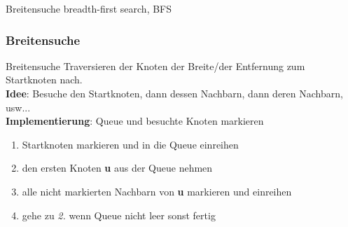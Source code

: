 \begin{frame}
    \Huge Breitensuche
    \Large breadth-first search, BFS
\end{frame}
\begin{frame}
    \frametitle{Breitensuche}
    \begin{KITinfoblock}{Breitensuche}
        Traversieren der Knoten der Breite/der Entfernung zum Startknoten nach.\\[0.7em]
        \textbf{Idee}: Besuche den Startknoten, dann dessen Nachbarn, dann deren Nachbarn, usw...\\[0.7em]
        \textbf{Implementierung}: Queue und besuchte Knoten markieren
        \begin{enumerate}
            \item Startknoten markieren und in die Queue einreihen
            \item den ersten Knoten \textbf{u} aus der Queue nehmen
            \item alle nicht markierten Nachbarn von \textbf{u} markieren und einreihen
            \item gehe zu \textit{2.} wenn Queue nicht leer sonst fertig
        \end{enumerate}
    \end{KITinfoblock}
\end{frame}


